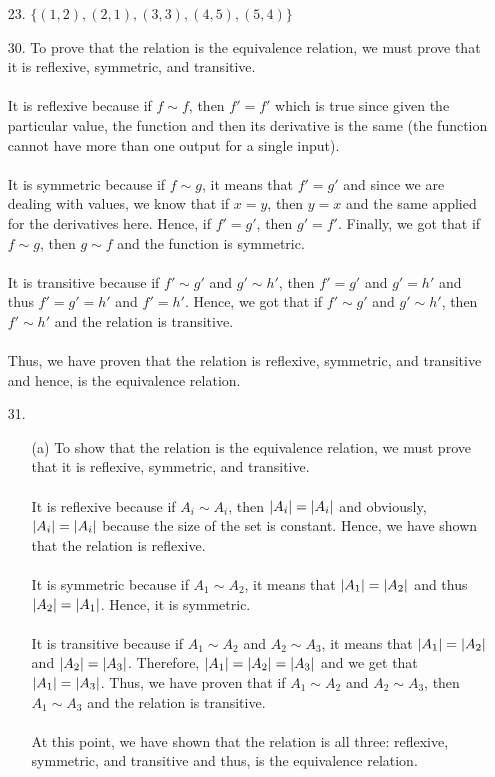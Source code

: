 \documentclass[12pt, a4paper]{article}
\DeclarePairedDelimiter\abs{\lvert}{\rvert}
\begin{document}
\begin{itemize}
\item[23.]
$\{(1, 2), (2, 1), (3, 3), (4, 5), (5, 4)\}$

\item[]
\item[]

\item[30.]
To prove that the relation is the equivalence relation, we must prove that it is reflexive, symmetric, and transitive.\\\\
It is reflexive because if $f \sim f$, then $f' = f'$ which is true since given the particular value, the function and then its derivative is the same (the function cannot have more than one output for a single input).\\\\
It is symmetric because if $f \sim g$, it means that $f' = g'$ and since we are dealing with values, we know that if $x = y$, then $y = x$ and the same applied for the derivatives here. Hence, if $f' = g'$, then $g' = f'$.
Finally, we got that if $f \sim g$, then $g \sim f$ and the function is symmetric.\\\\
It is transitive because if $f' \sim g'$ and $g' \sim h'$, then $f' = g'$ and $g' = h'$ and thus $f' = g' = h'$ and $f' = h'$.
Hence, we got that if $f' \sim g'$ and $g' \sim h'$, then $f' \sim h'$ and the relation is transitive.\\\\
Thus, we have proven that the relation is reflexive, symmetric, and transitive and hence, is the equivalence relation.

\item[]
\item[]

\item[31.]
\begin{itemize}
\item[(a)]
To show that the relation is the equivalence relation, we must prove that it is reflexive, symmetric, and transitive.\\\\
It is reflexive because if $A_i \sim A_i$, then $\abs{A_i} = \abs{A_i}$ and obviously, $\abs{A_i} = \abs{A_i}$ because the size of the set is constant.
Hence, we have shown that the relation is reflexive.\\\\
It is symmetric because if $A_1 \sim A_2$, it means that $\abs{A_1} = \abs{A_2}$ and thus $\abs{A_2} = \abs{A_1}$.
Hence, it is symmetric.\\\\
It is transitive because if $A_1 \sim A_2$ and $A_2 \sim A_3$, it means that $\abs{A_1} = \abs{A_2}$ and $\abs{A_2} = \abs{A_3}$.
Therefore, $\abs{A_1} = \abs{A_2} = \abs{A_3}$ and we get that $\abs{A_1} = \abs {A_3}$. Thus, we have proven that if $A_1 \sim A_2$
and $A_2 \sim A_3$, then $A_1 \sim A_3$ and the relation is transitive.\\\\
At this point, we have shown that the relation is all three: reflexive, symmetric, and transitive and thus, is the equivalence relation.


\end{itemize}
\end{itemize}
\end{document}
